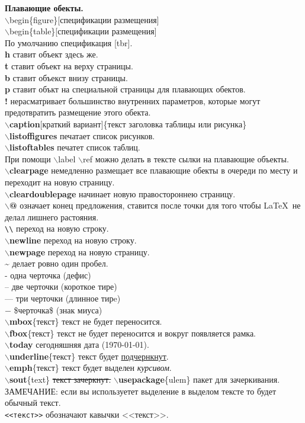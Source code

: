 \documentclass{article}
\newcommand{\bs}{$\backslash$}
\newcommand{\bd}[1]{{\bfseries #1}} %
\newcommand{\bb}[1]{\bd{\bs #1}} %
\begin{document}
\bd{Плавающие обекты.}\\
\bs begin\{figure\}[спецификации размещения]\\
\bs begin\{table\}[спецификации размещения]\\
По умолчанию спецификация [tbr].\\
\bd{h} ставит объект здесь же.\\
\bd{t} ставит объект на верху страницы.\\
\bd{b} ставит объекст внизу страницы.\\
\bd{p} ставит объкт на специальной страницы для плавающих обектов.\\
\bd{!} нерасматривает большинство внутренних параметров,
которые могут предотвратить размещение этого обекта.\\
\bb{caption}[краткий вариант]\{текст заголовка таблицы или рисунка\}\\
\bb{listoffigures} печатает список рисунков.\\
\bb{listoftables} печатет список таблиц.\\
При помощи \bs label \bs ref можно делать в тексте сылки на плавающие объекты.\\
\bb{clearpage} немедленно размещает все плавающие обекты в очереди по месту
и переходит на новую страницу.\\
\bb{cleardoublepage} начинает новую правостороннею страницу.\\

\bb{@} означает конец предложения, ставится после точки для того чтобы
\LaTeX~не делал лишнего растояния.\\
\verb|\\| переход на новую строку.\\
\bb{newline} переход на новую строку.\\
\bb{newpage} переход на новую страницу.\\
\~{} делает ровно один пробел.\\
- одна черточка (дефис)\\
-- две черточки (короткое тире)\\
--- три черточки (длинное тирe)\\
$-$ \$черточка\$ (знак миуса)\\
\bb{mbox}\{текст\} текст не будет переносится.\\
\bb{fbox}\{текст\} текст не будет переносится и вокруг появляется рамка.\\
\bb{today} сегодняшняя дата (\today).\\
\bb{underline}\{текст\} текст будет \underline{подчернкнут}.\\
\bb{emph}\{текст\} текст будет выделен \emph{курсивом}.\\
\bb{sout}\{text\} \sout{текст зачеркнут.}
\bb{usepackage}\{ulem\} пакет для зачеркивания.\\
ЗАМЕЧАНИЕ: если вы используетет выделение в выделом тексте
то будет обычный текст.\\
\verb|<<текст>>| обозначают кавычки <<текст>>.\\
\end{document}
